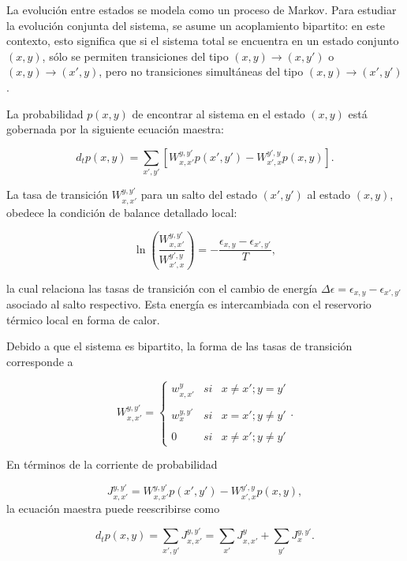 La evolución entre estados se modela como un proceso de Markov\cite{van1992stochastic}. Para estudiar la evolución conjunta del sistema, se asume un acoplamiento bipartito: en este contexto, esto significa que si el sistema total se encuentra en un estado conjunto $(x,y)$, sólo se permiten transiciones del tipo $(x,y) \to (x,y')$ o $(x,y) \to (x',y)$, pero no transiciones simultáneas del tipo $(x,y) \to (x',y')$.

La probabilidad \( p(x,y) \) de encontrar al sistema en el estado \( (x,y) \) está gobernada por la siguiente ecuación maestra:

\begin{equation*}
    d_{t}p(x,y) = \sum_{x',y'} \left[ W_{x,x'}^{y,y'}p(x',y')  - W_{x',x}^{y',y}p(x,y) \right].
\end{equation*}

La tasa de transición \( W_{x,x'}^{y,y'} \) para un salto del estado \( (x',y') \) al estado \( (x,y) \), obedece la condición de balance detallado local:

\[
\ln \left( \frac{W_{x,x'}^{y,y'}}{W_{x',x}^{y',y}} \right) = -\frac{\epsilon_{x,y} - \epsilon_{x',y'}}{T},
\]

la cual relaciona las tasas de transición con el cambio de energía \( \Delta \epsilon = \epsilon_{x,y} - \epsilon_{x',y'} \) asociado al salto respectivo. Esta energía es intercambiada con el reservorio térmico local en forma de calor.

Debido a que el sistema es bipartito, la forma de las tasas de transición corresponde a

\begin{equation*}
    W_{x,x'}^{y,y'} = \left\{ \begin{array}{lcc} w_{x,x'}^{y} & si & x \neq x'; y=y' \\ \\ w_{x}^{y,y'} & si & x=x';y\neq y'\\ \\ 0 & si & x \neq x'; y \neq y' \end{array} \right..
\end{equation*}

En términos de la corriente de probabilidad 

\begin{equation*}
    J_{x,x'}^{y,y'} = W_{x,x'}^{y,y'}p(x',y') - W_{x',x}^{y',y}p(x,y),
\end{equation*}
la ecuación maestra puede reescribirse como 

\begin{equation*}
    d_{t}p(x,y) = \sum_{x',y'}J_{x,x'}^{y,y'} = \sum_{x'}J_{x,x'}^{y} + \sum_{y'}J_{x}^{y,y'}.
\end{equation*}

